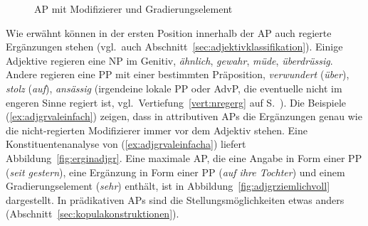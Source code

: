 \begin{exe}
  \ex\label{ex:adjgrnormal2}
  \begin{xlist}
  \end{xlist}
\end{exe}

\begin{figure}[!htbp]
  \centering
  \caption{AP mit Modifizierer und Gradierungselement}
  \label{fig:adgrnormalana}
\end{figure}

Wie erwähnt können in der ersten Position innerhalb der AP auch regierte Ergänzungen stehen (vgl.\ auch Abschnitt~\ref{sec:adjektivklassifikation}).
Einige Adjektive regieren eine NP im Genitiv, \zB \textit{ähnlich}, \textit{gewahr}, \textit{müde}, \textit{überdrüssig}.
Andere regieren eine PP mit einer bestimmten Präposition, \zB \textit{verwundert} (\textit{über}), \textit{stolz} (\textit{auf}), \textit{ansässig} (irgendeine lokale PP oder AdvP, die eventuelle nicht im engeren Sinne regiert ist, vgl.\ Vertiefung~\ref{vert:nregerg} auf S.~\pageref{vert:nregerg}).
Die Beispiele (\ref{ex:adjgrvaleinfach}) zeigen, dass in attributiven APs die Ergänzungen genau wie die nicht-regierten Modifizierer immer vor dem Adjektiv stehen.
Eine Konstituentenanalyse von (\ref{ex:adjgrvaleinfacha}) liefert Abbildung~\ref{fig:erginadjgr}.
Eine maximale AP, die eine Angabe in Form einer PP (\textit{seit gestern}), eine Ergänzung in Form einer PP (\textit{auf ihre Tochter}) und einem Gradierungselement (\textit{sehr}) enthält, ist in Abbildung~\ref{fig:adjgrziemlichvoll} dargestellt.
In prädikativen APs sind die Stellungsmöglichkeiten etwas anders (Abschnitt~\ref{sec:kopulakonstruktionen}).

\begin{exe}
  \ex\label{ex:adjgrvaleinfach}
  \begin{xlist}
  \end{xlist}
\end{exe}

